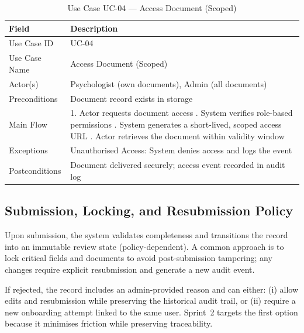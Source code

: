 \documentclass[a4paper,12pt]{report}
\renewcommand{\arraystretch}{1.25}
\begin{document}
\begin{table}[H]
\centering
\renewcommand{\arraystretch}{1.4}
\begin{tabularx}{\textwidth}{|l|X|}
\hline
\rowcolor{medgray}
\textbf{Field} & \textbf{Description} \\ \hline

Use Case ID & UC-04 \\ \hline
Use Case Name & Access Document (Scoped) \\ \hline
Actor(s) & Psychologist (own documents), Admin (all documents) \\ \hline

Preconditions & Document record exists in storage \\ \hline

Main Flow &
1. Actor requests document access \newline
2. System verifies role-based permissions \newline
3. System generates a short-lived, scoped access URL \newline
4. Actor retrieves the document within validity window \\ \hline

Exceptions &
Unauthorised Access: System denies access and logs the event \\ \hline

Postconditions &
Document delivered securely; access event recorded in audit log \\ \hline

\end{tabularx}
\caption{Use Case UC-04 — Access Document (Scoped)}
\end{table}

\subsection{Submission, Locking, and Resubmission Policy}
\label{sec:uc-submission}

Upon submission, the system validates completeness and transitions the record
into an immutable review state (policy-dependent). A common approach is to lock
critical fields and documents to avoid post-submission tampering; any changes
require explicit resubmission and generate a new audit event.

If rejected, the record includes an admin-provided reason and can either:
(i) allow edits and resubmission while preserving the historical audit trail, or
(ii) require a new onboarding attempt linked to the same user. Sprint~2 targets
the first option because it minimises friction while preserving traceability.
\end{document}
